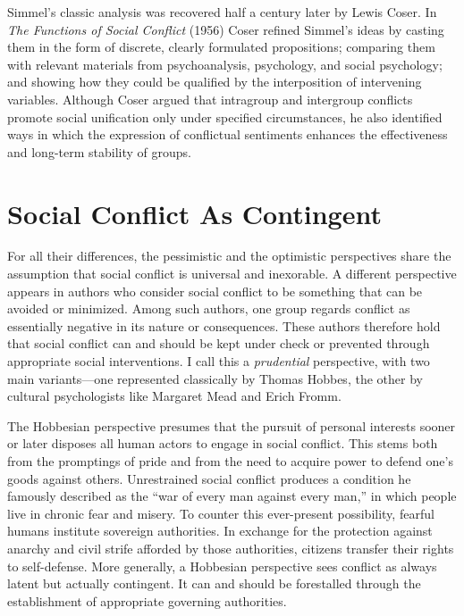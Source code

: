 Simmel's classic analysis was recovered half a century later by Lewis Coser. In \emph{The Functions of Social Conflict} (1956) Coser refined Simmel's ideas by casting them in the form of discrete, clearly formulated propositions; comparing them with relevant materials from psychoanalysis, psychology, and social psychology; and showing how they could be qualified by the interposition of intervening variables. Although Coser argued that intragroup and intergroup conflicts promote social unification only under specified circumstances, he also identified ways in which the expression of conflictual sentiments enhances the effectiveness and long-term stability of groups.

\section*{Social Conflict As Contingent}

For all their differences, the pessimistic and the optimistic perspectives share the assumption that social conflict is universal and inexorable. A different perspective appears in authors who consider social conflict to be something that can be avoided or minimized. Among such authors, one group regards conflict as essentially negative in its nature or consequences. These authors therefore hold that social conflict can and should be kept under check or prevented through appropriate social interventions. I call this a \emph{prudential} perspective, with two main variants---one represented classically by Thomas Hobbes, the other by cultural psychologists like Margaret Mead and Erich Fromm. 

The Hobbesian perspective presumes that the pursuit of personal interests sooner or later disposes all human actors to engage in social conflict. This stems both from the promptings of pride and from the need to acquire power to defend one's goods against others. Unrestrained social conflict produces a condition he famously described as the ``war of every man against every man,'' in which people live in chronic fear and misery. To counter this ever-present possibility, fearful humans institute sovereign authorities. In exchange for the protection against anarchy and civil strife afforded by those authorities, citizens transfer their rights to self-defense. More generally, a Hobbesian perspective sees conflict as always latent but actually contingent. It can and should be forestalled through the establishment of appropriate governing authorities.

